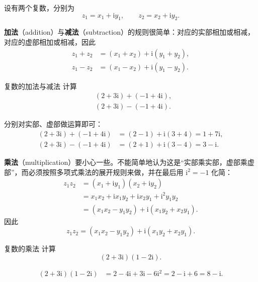 设有两个复数，分别为
\[
z_1=x_1+\mathrm{i}y_1,\qquad z_2=x_2+\mathrm{i}y_2.
\]

\noindent\textbf{加法}（addition）与\textbf{减法}（subtraction）的规则很简单：对应的实部相加或相减，对应的虚部相加或相减，因此
\begin{align}
    z_1+z_2&=(x_1+x_2)+\mathrm{i}(y_1+y_2),\label{eq:complex-addition-algebraic}\\
    z_1-z_2&=(x_1-x_2)+\mathrm{i}(y_1-y_2).\label{eq:complex-subtraction-algebraic}
\end{align}

\begin{lizi}{复数的加法与减法}{}
计算
\[
\begin{aligned}
    &(2+3\mathrm{i})+(-1+4\mathrm{i}),\\
    &(2+3\mathrm{i})-(-1+4\mathrm{i}).
\end{aligned}
\]

\begin{jie}
分别对实部、虚部做运算即可：
\begin{align*}
    (2+3\mathrm{i})+(-1+4\mathrm{i})
    &=(2-1)+\mathrm{i}(3+4)=1+7\mathrm{i},\\
    (2+3\mathrm{i})-(-1+4\mathrm{i})
    &=(2+1)+\mathrm{i}(3-4)=3-\mathrm{i}.
\end{align*}
\end{jie}
\end{lizi}

\medskip
\noindent\textbf{乘法}（multiplication）要小心一些。不能简单地认为这是``实部乘实部，虚部乘虚部''，而必须按照多项式乘法的展开规则来做，并在最后用 $\mathrm{i}^2=-1$ 化简：
\begin{align*}
    z_1z_2
    &=(x_1+\mathrm{i}y_1)(x_2+\mathrm{i}y_2)\\
    &=x_1x_2+\mathrm{i}x_1y_2+\mathrm{i}x_2y_1+\mathrm{i}^2y_1y_2\\
    &=(x_1x_2-y_1y_2)+\mathrm{i}(x_1y_2+x_2y_1).
\end{align*}
因此
\begin{equation}\label{eq:complex-multiplication-algebraic}
    z_1z_2=(x_1x_2-y_1y_2)+\mathrm{i}(x_1y_2+x_2y_1).
\end{equation}

\begin{lizi}{复数的乘法}{}
计算
\[
(2+3\mathrm{i})(1-2\mathrm{i}).
\]

\begin{jie}
\begin{align*}
    (2+3\mathrm{i})(1-2\mathrm{i})
    &=2-4\mathrm{i}+3\mathrm{i}-6\mathrm{i}^2
    =2-\mathrm{i}+6
    =8-\mathrm{i}.
\end{align*}
\end{jie}
\end{lizi}

